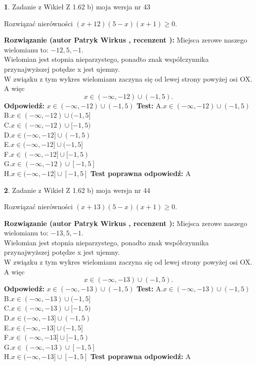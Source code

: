 \documentclass[12pt, a4paper]{article}
\theoremstyle{definition} %
\newtheorem{zad}{}
\newcommand{\zadStart}[1]{\begin{zad}#1\newline}
\newcommand{\zadStop}{\end{zad}}
\newcommand{\rozwStart}[2]{\noindent \textbf{Rozwiązanie (autor #1 , recenzent #2): }\newline}
\newcommand{\rozwStop}{\newline}
\newcommand{\odpStart}{\noindent \textbf{Odpowiedź:}\newline}
\newcommand{\odpStop}{\newline}
\newcommand{\testStart}{\noindent \textbf{Test:}\newline}
\newcommand{\testStop}{\newline}
\newcommand{\kluczStart}{\noindent \textbf{Test poprawna odpowiedź:}\newline}
\newcommand{\kluczStop}{\newline}
\begin{document}
\zadStart{Zadanie z Wikieł Z 1.62 b) moja wersja nr 43}

Rozwiązać nierówności $(x+12)(5-x)(x+1)\ge0$.
\zadStop
\rozwStart{Patryk Wirkus}{}
Miejsca zerowe naszego wielomianu to: $-12, 5, -1$.\\
Wielomian jest stopnia nieparzystego, ponadto znak współczynnika przy\linebreak najwyższej potędze x jest ujemny.\\ W związku z tym wykres wielomianu zaczyna się od lewej strony powyżej osi OX. A więc $$x \in (-\infty,-12) \cup (-1,5).$$
\rozwStop
\odpStart
$x \in (-\infty,-12) \cup (-1,5)$
\odpStop
\testStart
A.$x \in (-\infty,-12) \cup (-1,5)$\\
B.$x \in (-\infty,-12) \cup (-1,5]$\\
C.$x \in (-\infty,-12) \cup [-1,5)$\\
D.$x \in (-\infty,-12] \cup (-1,5)$\\
E.$x \in (-\infty,-12] \cup (-1,5]$\\
F.$x \in (-\infty,-12] \cup [-1,5)$\\
G.$x \in (-\infty,-12) \cup [-1,5]$\\
H.$x \in (-\infty,-12] \cup [-1,5]$
\testStop
\kluczStart
A
\kluczStop



\zadStart{Zadanie z Wikieł Z 1.62 b) moja wersja nr 44}

Rozwiązać nierówności $(x+13)(5-x)(x+1)\ge0$.
\zadStop
\rozwStart{Patryk Wirkus}{}
Miejsca zerowe naszego wielomianu to: $-13, 5, -1$.\\
Wielomian jest stopnia nieparzystego, ponadto znak współczynnika przy\linebreak najwyższej potędze x jest ujemny.\\ W związku z tym wykres wielomianu zaczyna się od lewej strony powyżej osi OX. A więc $$x \in (-\infty,-13) \cup (-1,5).$$
\rozwStop
\odpStart
$x \in (-\infty,-13) \cup (-1,5)$
\odpStop
\testStart
A.$x \in (-\infty,-13) \cup (-1,5)$\\
B.$x \in (-\infty,-13) \cup (-1,5]$\\
C.$x \in (-\infty,-13) \cup [-1,5)$\\
D.$x \in (-\infty,-13] \cup (-1,5)$\\
E.$x \in (-\infty,-13] \cup (-1,5]$\\
F.$x \in (-\infty,-13] \cup [-1,5)$\\
G.$x \in (-\infty,-13) \cup [-1,5]$\\
H.$x \in (-\infty,-13] \cup [-1,5]$
\testStop
\kluczStart
A
\kluczStop
\end{document}
